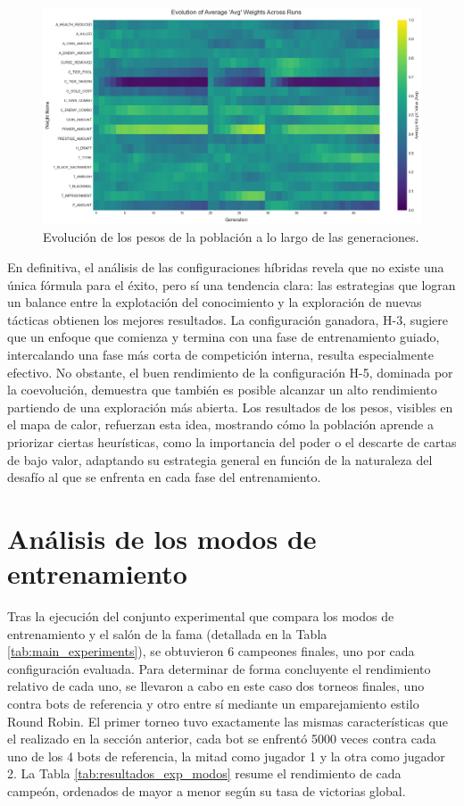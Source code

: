 \begin{figure}[H]
	\centering
	\includegraphics[width=1.0\textwidth]{img/424_heat_avg.png}
	\caption{Evolución de los pesos de la población a lo largo de las generaciones.}
	\label{fig:heat_avg_424}
\end{figure}

En definitiva, el análisis de las configuraciones híbridas revela que no existe una única fórmula para el éxito, pero sí una tendencia clara: las estrategias que logran un balance entre la explotación del conocimiento y la exploración de nuevas tácticas obtienen los mejores resultados. La configuración ganadora, H-3, sugiere que un enfoque que comienza y termina con una fase de entrenamiento guiado, intercalando una fase más corta de competición interna, resulta especialmente efectivo. No obstante, el buen rendimiento de la configuración H-5, dominada por la coevolución, demuestra que también es posible alcanzar un alto rendimiento partiendo de una exploración más abierta. Los resultados de los pesos, visibles en el mapa de calor, refuerzan esta idea, mostrando cómo la población aprende a priorizar ciertas heurísticas, como la importancia del poder o el descarte de cartas de bajo valor, adaptando su estrategia general en función de la naturaleza del desafío al que se enfrenta en cada fase del entrenamiento.

\section{Análisis de los modos de entrenamiento} \label{sec:analisis_modos_entrenamiento}

Tras la ejecución del conjunto experimental que compara los modos de entrenamiento y el salón de la fama (detallada en la Tabla \ref{tab:main_experiments}), se obtuvieron 6 campeones finales, uno por cada configuración evaluada. Para determinar de forma concluyente el rendimiento relativo de cada uno, se llevaron a cabo en este caso dos torneos finales, uno contra bots de referencia y otro entre sí mediante un emparejamiento estilo Round Robin. El primer torneo tuvo exactamente las mismas características que el realizado en la sección anterior, cada bot se enfrentó 5000 veces contra cada uno de los 4 bots de referencia, la mitad como jugador 1 y la otra como jugador 2. La Tabla \ref{tab:resultados_exp_modos} resume el rendimiento de cada campeón, ordenados de mayor a menor según su tasa de victorias global.

